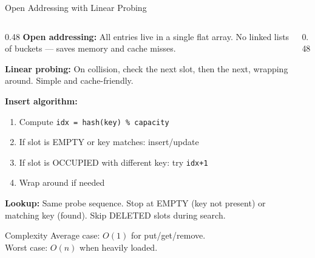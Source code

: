 \documentclass[aspectratio=169, 10pt]{beamer}
\begin{document}
\begin{frame}{Open Addressing with Linear Probing}
\begin{columns}[T]
\begin{column}{0.48\textwidth}
\textbf{Open addressing:} All entries live in a single flat array.
No linked lists of buckets --- saves memory and cache misses.

\vspace{0.5em}
\textbf{Linear probing:} On collision, check the next slot, then
the next, wrapping around. Simple and cache-friendly.

\vspace{0.5em}
\textbf{Insert algorithm:}
\begin{enumerate}
  \item Compute \texttt{idx = hash(key) \% capacity}
  \item If slot is EMPTY or key matches: insert/update
  \item If slot is OCCUPIED with different key: try \texttt{idx+1}
  \item Wrap around if needed
\end{enumerate}

\vspace{0.3em}
\textbf{Lookup:} Same probe sequence. Stop at EMPTY (key not present)
or matching key (found). Skip DELETED slots during search.

\vspace{0.3em}
\begin{block}{Complexity}
Average case: $O(1)$ for put/get/remove.\\
Worst case: $O(n)$ when heavily loaded.
\end{block}
\end{column}

\begin{column}{0.48\textwidth}
\begin{center}
\end{center}
\end{column}
\end{columns}
\end{frame}
\end{document}

